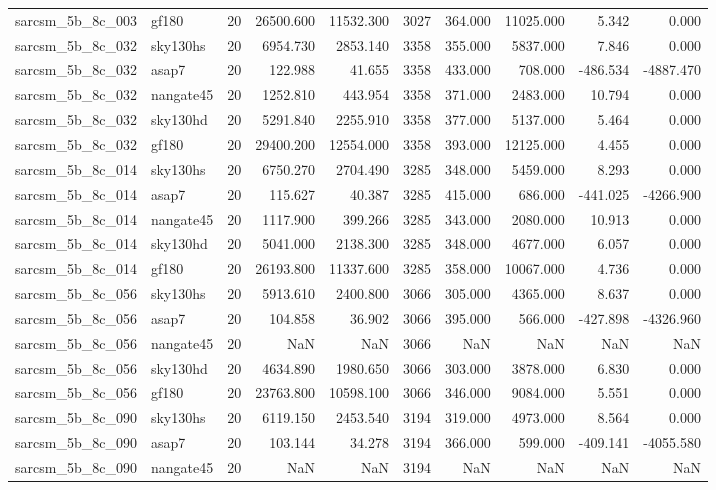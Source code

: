 \documentclass{article}
\begin{document}
\begin{longtable}{llrrrrrrrr}
sarcsm\_5b\_8c\_003 & gf180 & 20 & 26500.600 & 11532.300 & 3027 & 364.000 & 11025.000 & 5.342 & 0.000 \\
sarcsm\_5b\_8c\_032 & sky130hs & 20 & 6954.730 & 2853.140 & 3358 & 355.000 & 5837.000 & 7.846 & 0.000 \\
sarcsm\_5b\_8c\_032 & asap7 & 20 & 122.988 & 41.655 & 3358 & 433.000 & 708.000 & -486.534 & -4887.470 \\
sarcsm\_5b\_8c\_032 & nangate45 & 20 & 1252.810 & 443.954 & 3358 & 371.000 & 2483.000 & 10.794 & 0.000 \\
sarcsm\_5b\_8c\_032 & sky130hd & 20 & 5291.840 & 2255.910 & 3358 & 377.000 & 5137.000 & 5.464 & 0.000 \\
sarcsm\_5b\_8c\_032 & gf180 & 20 & 29400.200 & 12554.000 & 3358 & 393.000 & 12125.000 & 4.455 & 0.000 \\
sarcsm\_5b\_8c\_014 & sky130hs & 20 & 6750.270 & 2704.490 & 3285 & 348.000 & 5459.000 & 8.293 & 0.000 \\
sarcsm\_5b\_8c\_014 & asap7 & 20 & 115.627 & 40.387 & 3285 & 415.000 & 686.000 & -441.025 & -4266.900 \\
sarcsm\_5b\_8c\_014 & nangate45 & 20 & 1117.900 & 399.266 & 3285 & 343.000 & 2080.000 & 10.913 & 0.000 \\
sarcsm\_5b\_8c\_014 & sky130hd & 20 & 5041.000 & 2138.300 & 3285 & 348.000 & 4677.000 & 6.057 & 0.000 \\
sarcsm\_5b\_8c\_014 & gf180 & 20 & 26193.800 & 11337.600 & 3285 & 358.000 & 10067.000 & 4.736 & 0.000 \\
sarcsm\_5b\_8c\_056 & sky130hs & 20 & 5913.610 & 2400.800 & 3066 & 305.000 & 4365.000 & 8.637 & 0.000 \\
sarcsm\_5b\_8c\_056 & asap7 & 20 & 104.858 & 36.902 & 3066 & 395.000 & 566.000 & -427.898 & -4326.960 \\
sarcsm\_5b\_8c\_056 & nangate45 & 20 & NaN & NaN & 3066 & NaN & NaN & NaN & NaN \\
sarcsm\_5b\_8c\_056 & sky130hd & 20 & 4634.890 & 1980.650 & 3066 & 303.000 & 3878.000 & 6.830 & 0.000 \\
sarcsm\_5b\_8c\_056 & gf180 & 20 & 23763.800 & 10598.100 & 3066 & 346.000 & 9084.000 & 5.551 & 0.000 \\
sarcsm\_5b\_8c\_090 & sky130hs & 20 & 6119.150 & 2453.540 & 3194 & 319.000 & 4973.000 & 8.564 & 0.000 \\
sarcsm\_5b\_8c\_090 & asap7 & 20 & 103.144 & 34.278 & 3194 & 366.000 & 599.000 & -409.141 & -4055.580 \\
sarcsm\_5b\_8c\_090 & nangate45 & 20 & NaN & NaN & 3194 & NaN & NaN & NaN & NaN \\

\end{longtable}
\end{document}
